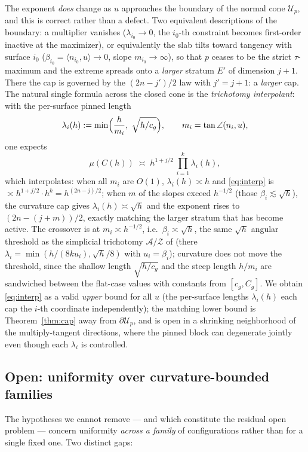 \documentclass[11pt]{article}
\begin{document}
The exponent \emph{does} change as $u$ approaches the boundary of the normal
cone $\mathcal U_p$, and this is correct rather than a defect.  Two equivalent
descriptions of the boundary: a multiplier vanishes ($\lambda_{i_0}\to0$, the
$i_0$-th constraint becomes first-order inactive at the maximizer), or
equivalently the slab tilts toward tangency with surface $i_0$
($\beta_{i_0}=\langle n_{i_0},u\rangle\to0$, slope $m_{i_0}\to\infty$), so that
$p$ ceases to be the strict $\tau$-maximum and the extreme spreads onto a
\emph{larger} stratum $E'$ of dimension $j+1$.  There the cap is governed by the
$(2n-j')/2$ law with $j'=j+1$: a \emph{larger} cap.  The natural single formula
across the closed cone is the \emph{trichotomy interpolant}: with the per-surface
pinned length
\[
\lambda_i(h):=\min\Bigl(\frac{h}{m_i},\ \sqrt{h/c_g}\Bigr),
\qquad m_i=\tan\angle(n_i,u),
\]
one expects
\begin{equation}\label{eq:interp}
\mu(C(h))\;\asymp\;h^{1+j/2}\,\prod_{i=1}^k\lambda_i(h),
\end{equation}
which interpolates: when all $m_i$ are $O(1)$, $\lambda_i(h)\asymp h$ and
\eqref{eq:interp} is $\asymp h^{1+j/2}\cdot h^k=h^{(2n-j)/2}$; when $m$ of the
slopes exceed $h^{-1/2}$ (those $\beta_i\lesssim\sqrt h$), the curvature cap
gives $\lambda_i(h)\asymp\sqrt h$ and the exponent rises to $(2n-(j+m))/2$,
exactly matching the larger stratum that has become active.  The crossover is at
$m_i\asymp h^{-1/2}$, i.e.\ $\beta_i\asymp\sqrt h$, the same $\sqrt h$ angular
threshold as the simplicial trichotomy $\mathcal A/\mathcal Z$ of
\cite{companion11} (there $\lambda_i=\min(h/(8ku_i),\sqrt h/8)$ with
$u_i=\beta_i$); curvature does not move the threshold, since the shallow length
$\sqrt{h/c_g}$ and the steep length $h/m_i$ are sandwiched between the flat-case
values with constants from $[c_g,C_g]$.  We obtain \eqref{eq:interp} as a valid
\emph{upper} bound for all $u$ (the per-surface lengths $\lambda_i(h)$ each cap
the $i$-th coordinate independently); the matching lower bound is
Theorem~\ref{thm:cap} away from $\partial\mathcal U_p$, and is open in a
shrinking neighborhood of the multiply-tangent directions, where the pinned
block can degenerate jointly even though each $\lambda_i$ is controlled.

\subsection{Open: uniformity over curvature-bounded families}

The hypotheses we cannot remove --- and which constitute the residual open
problem --- concern uniformity \emph{across a family} of configurations rather
than for a single fixed one.  Two distinct gaps:
\end{document}
